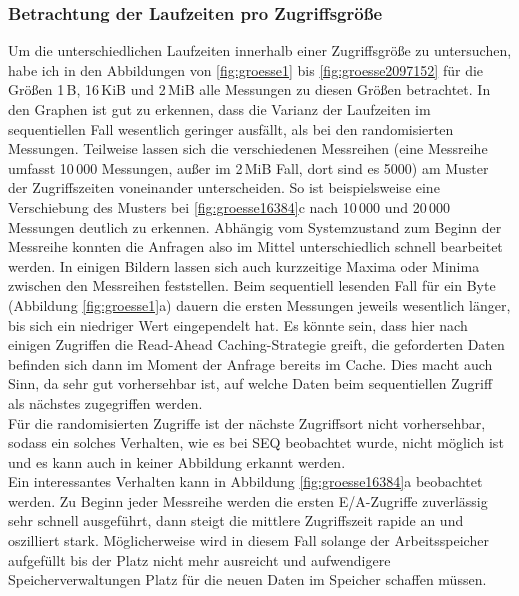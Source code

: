 \documentclass[
	12pt,
	a4paper,
	BCOR10mm,
	DIV14,
	listof=totoc,
	bibliography=totoc,
	headsepline
]{scrreprt}
\begin{document}
\subsubsection{Betrachtung der Laufzeiten pro Zugriffsgröße}
Um die unterschiedlichen Laufzeiten innerhalb einer Zugriffsgröße zu untersuchen, habe ich in den Abbildungen von \ref{fig:groesse1} bis \ref{fig:groesse2097152} für die Größen 1\,B, 16\,KiB und 2\,MiB alle Messungen zu diesen Größen betrachtet.
In den Graphen ist gut zu erkennen, dass die Varianz der Laufzeiten im sequentiellen Fall wesentlich geringer ausfällt, als bei den randomisierten Messungen.
Teilweise lassen sich die verschiedenen Messreihen (eine Messreihe umfasst 10\,000 Messungen, außer im 2\,MiB Fall, dort sind es 5000) am Muster der Zugriffszeiten voneinander unterscheiden.
So ist beispielsweise eine Verschiebung des Musters bei \ref{fig:groesse16384}c nach 10\,000 und 20\,000 Messungen deutlich zu erkennen.
Abhängig vom Systemzustand zum Beginn der Messreihe konnten die Anfragen also im Mittel unterschiedlich schnell bearbeitet werden.
In einigen Bildern lassen sich auch kurzzeitige Maxima oder Minima zwischen den Messreihen feststellen.
Beim sequentiell lesenden Fall für ein Byte (Abbildung \ref{fig:groesse1}a) dauern die ersten Messungen jeweils wesentlich länger, bis sich ein niedriger Wert eingependelt hat. Es könnte sein, dass hier nach einigen Zugriffen die Read-Ahead Caching-Strategie greift, die geforderten Daten befinden sich dann im Moment der Anfrage bereits im Cache. Dies macht auch Sinn, da sehr gut vorhersehbar ist, auf welche Daten beim sequentiellen Zugriff als nächstes zugegriffen werden.\\
Für die randomisierten Zugriffe ist der nächste Zugriffsort nicht vorhersehbar, sodass ein solches Verhalten, wie es bei SEQ beobachtet wurde, nicht möglich ist und es kann auch in keiner Abbildung erkannt werden.\\
Ein interessantes Verhalten kann in Abbildung \ref{fig:groesse16384}a beobachtet werden.
Zu Beginn jeder Messreihe werden die ersten E/A-Zugriffe zuverlässig sehr schnell ausgeführt, dann steigt die mittlere Zugriffszeit rapide an und oszilliert stark.
Möglicherweise wird in diesem Fall solange der Arbeitsspeicher aufgefüllt bis der Platz nicht mehr ausreicht und aufwendigere Speicherverwaltungen Platz für die neuen Daten im Speicher schaffen müssen.
\end{document}
